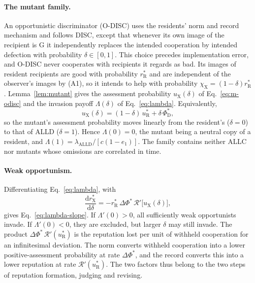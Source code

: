 \documentclass[10pt]{wlscirep}
\newcommand{\Rmap}{\mathscr{R}}            %
\newcommand{\rR}{r_{\mathrm{R}}^{*}}
\newcommand{\uR}{u_{\mathrm{R}}^{*}}
\newcommand{\rX}{r_{\mathrm{X}}^{*}}
\newcommand{\uX}{u_{\mathrm{X}}}
\newcommand{\PhiDs}{\Phi^{*}_{\mathrm{D}}}
\newcommand{\dPhi}{\Delta\Phi^{*}}
\newcommand{\dd}{\mathrm{d}}
\newcommand{\ALLD}{\mathrm{ALLD}}
\theoremstyle{plain}
\theoremstyle{remark}
\begin{document}
\paragraph{The mutant family.} An opportunistic discriminator (O-DISC) uses the residents' norm and record mechanism and follows DISC, except that whenever its own image of the recipient is G it independently replaces the intended cooperation by intended defection with probability $\delta\in[0,1]$. This choice precedes implementation error, and O-DISC never cooperates with recipients it regards as bad. Its images of resident recipients are good with probability $\rR$ and are independent of the observer's images by (A1), so it intends to help with probability $\chi_{\mathrm X}=(1-\delta)\rR$. Lemma~\ref{lem:mutant} gives the assessment probability $\uX(\delta)$ of Eq.~\eqref{eq:m-odisc} and the invasion payoff $\Lambda(\delta)$ of Eq.~\eqref{eq:lambda}. Equivalently,
\begin{equation}
\uX(\delta)=(1-\delta)\,\uR+\delta\,\PhiDs,
\label{eq:s-odisc-u}
\end{equation}
so the mutant's assessment probability moves linearly from the resident's ($\delta=0$) to that of ALLD ($\delta=1$). Hence $\Lambda(0)=0$, the mutant being a neutral copy of a resident, and $\Lambda(1)=\lambda_{\ALLD}/[c(1-e_1)]$. The family contains neither ALLC nor mutants whose omissions are correlated in time.

\paragraph{Weak opportunism.} Differentiating Eq.~\eqref{eq:lambda}, with
\begin{equation}
\frac{\dd\rX}{\dd\delta}=-\rR\,\dPhi\,\Rmap'\bigl[\uX(\delta)\bigr],
\label{eq:s-drX}
\end{equation}
gives Eq.~\eqref{eq:lambda-slope}. If $\Lambda'(0)>0$, all sufficiently weak opportunists invade. If $\Lambda'(0)<0$, they are excluded, but larger $\delta$ may still invade. The product $\dPhi\,\Rmap'(\uR)$ is the reputation lost per unit of withheld cooperation for an infinitesimal deviation. The norm converts withheld cooperation into a lower positive-assessment probability at rate $\dPhi$, and the record converts this into a lower reputation at rate $\Rmap'(\uR)$. The two factors thus belong to the two steps of reputation formation, judging and revising.
\end{document}
